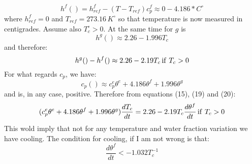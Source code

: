 \begin{equation}
h^f() = h^f_{ref} -(T-T_{ref})c_p^f \approx 0 - 4.186*  C^\circ   
\end{equation}
where \(h_{ref}^f=0\) and \(T_{ref} = 273.16\, K^\circ\) so that temperature is now measured in centigrades. Assume also \(T_c^\circ >0 \).
At the same time for \(g\) is 
\begin{equation}
h^g( ) \approx 2.26  - 1.996 T_c
\end{equation}
and therefore:
\begin{equation}
h^g()-h^f() \approx 2.26 - 2.19 T_c \, {\rm if}\ T_c > 0
\end{equation}
For what regards \( c_p\), we have:
\begin{equation}
c_p() \approx c_p^e \theta^e + 4.186 \theta^f + 1.996 \theta^g
\end{equation}
and is, in any case, positive.
Therefore from equations (15), (19) and (20):
\begin{equation}
(c_p^e \theta^e + 4.186 \theta^f + 1.996 \theta^g) \frac{dT_c}{dt} = 2.26 - 2.19 T_c \frac{d\theta^f}{dt}\, {\rm if}\ T_c > 0
\end{equation}
This wold imply that not for any temperature and water fraction variation we have cooling. The condition for cooling, if I am not wrong is that:
\begin{equation}
\frac{d\theta^f}{dt} < - 1.032 T_c^{-1} 
\end{equation}